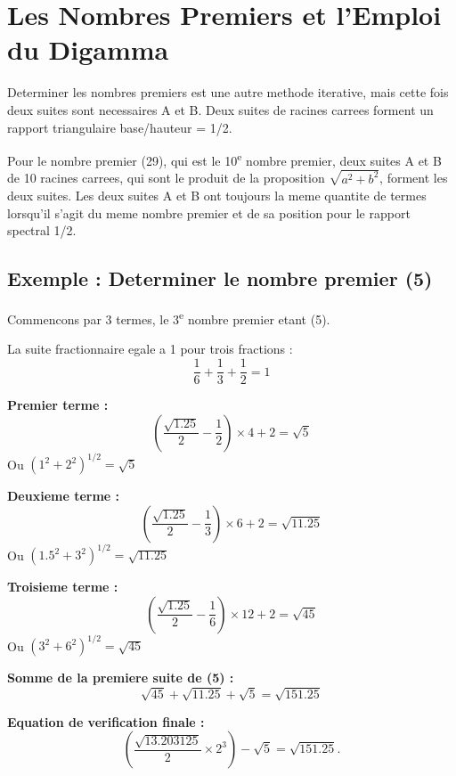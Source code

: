 \documentclass[a4paper,11pt]{article}
\newenvironment{mydef}[1]{%
    \begin{tcolorbox}[colback=blue!5,colframe=holblue,title={\textbf{Définition : #1}}]
}{%
    \end{tcolorbox}
}
\newenvironment{exemple}[1][]{%
    \begin{tcolorbox}[colback=green!5,colframe=holgreen,title={\textbf{Exemple #1}}]
}{%
    \end{tcolorbox}
}
\begin{document}
\newpage
\section{Les Nombres Premiers et l'Emploi du Digamma}

Determiner les nombres premiers est une autre methode iterative, mais cette fois deux suites sont necessaires A et B. Deux suites de racines carrees forment un rapport triangulaire base/hauteur = 1/2.

\begin{mydef}{Suites pour les nombres premiers}
Pour le nombre premier (29), qui est le 10\textsuperscript{e} nombre premier, deux suites A et B de 10 racines carrees, qui sont le produit de la proposition $\sqrt{a^2 + b^2}$, forment les deux suites. Les deux suites A et B ont toujours la meme quantite de termes lorsqu'il s'agit du meme nombre premier et de sa position pour le rapport spectral 1/2.
\end{mydef}

\subsection{Exemple : Determiner le nombre premier (5)}

Commencons par 3 termes, le 3\textsuperscript{e} nombre premier etant (5).

La suite fractionnaire egale a 1 pour trois fractions :
\[
\frac{1}{6} + \frac{1}{3} + \frac{1}{2} = 1
\]

\begin{exemple}[: Calcul de la premiere suite pour (5)]
\textbf{Premier terme :}
\[
\left(\frac{\sqrt{1.25}}{2} - \frac{1}{2}\right) \times 4 + 2 = \sqrt{5}
\]
Ou $(1^2 + 2^2)^{1/2} = \sqrt{5}$

\textbf{Deuxieme terme :}
\[
\left(\frac{\sqrt{1.25}}{2} - \frac{1}{3}\right) \times 6 + 2 = \sqrt{11.25}
\]
Ou $(1.5^2 + 3^2)^{1/2} = \sqrt{11.25}$

\textbf{Troisieme terme :}
\[
\left(\frac{\sqrt{1.25}}{2} - \frac{1}{6}\right) \times 12 + 2 = \sqrt{45}
\]
Ou $(3^2 + 6^2)^{1/2} = \sqrt{45}$

\textbf{Somme de la premiere suite de (5) :}
\[
\sqrt{45} + \sqrt{11.25} + \sqrt{5} = \sqrt{151.25}
\]

\textbf{Equation de verification finale :}
\[
\left( \frac{\sqrt{13.203125}}{2} \times 2^{3} \right) - \sqrt{5}
= \sqrt{151.25}.
\]
\end{exemple}
\end{document}
